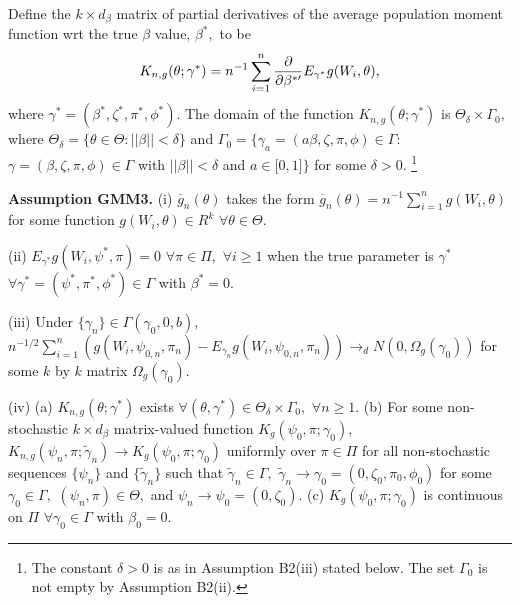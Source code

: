 \documentclass[12pt,thmsb,titlepage,final,oneside,letterpaper]{article}
\begin{document}
Define the $k\times d_{\beta }$ matrix of partial derivatives of the average
population moment function wrt the true $\beta $ value, $\beta ^{\ast },$ to
be%
\begin{equation}
K_{n,g}(\theta ;\gamma ^{\ast })=n^{-1}\sum_{i=1}^{n}\frac{\partial }{%
\partial \beta ^{\ast \prime }}E_{\gamma ^{\ast }}g(W_{i},\theta ),
\label{exp fn2}
\end{equation}%
where $\gamma ^{\ast }=(\beta ^{\ast },\zeta ^{\ast },\pi ^{\ast },\phi
^{\ast }).$ The domain of the function $K_{n,g}(\theta ;\gamma ^{\ast })$ is 
$\Theta _{\delta }\times \Gamma _{0},$ where $\Theta _{\delta }=\{\theta \in
\Theta :||\beta ||<\delta \}$ and $\Gamma _{0}=\{\gamma _{a}=(a\beta ,\zeta
,\pi ,\phi )\in \Gamma :$ $\gamma =(\beta ,\zeta ,\pi ,\phi )\in \Gamma $
with $||\beta ||<\delta $ and $a\in \lbrack 0,1]\}$ for some $\delta >0.$%
\footnote{%
The constant $\delta >0$ is as in Assumption B2(iii) stated below. The set $%
\Gamma _{0}$ is not empty by Assumption B2(ii).}\medskip

\noindent \textbf{Assumption GMM3.} (i) $\overline{g}_{n}\left( \theta
\right) $ takes the form $\overline{g}_{n}(\theta
)=n^{-1}\sum_{i=1}^{n}g(W_{i},\theta )$ for some function $g\left(
W_{i},\theta \right) \in R^{k}$ $\forall \theta \in \Theta .$

\noindent (ii) $E_{\gamma ^{\ast }}g(W_{i},\psi ^{\ast },\pi )=0$ $\forall
\pi \in \Pi ,$ $\forall i\geq 1$ when the true parameter is $\gamma ^{\ast }$
$\forall \gamma ^{\ast }=(\psi ^{\ast },\pi ^{\ast },\phi ^{\ast })\in
\Gamma $ with $\beta ^{\ast }=0.$

\noindent (iii) Under $\{\gamma _{n}\}\in \Gamma (\gamma _{0},0,b),$ $%
n^{-1/2}\sum_{i=1}^{n}(g(W_{i},\psi _{0,n},\pi _{n})-E_{\gamma
_{n}}g(W_{i},\psi _{0,n},\pi _{n}))\rightarrow _{d}N(0,\allowbreak \Omega
_{g}(\gamma _{0}))$ for some $k$ by $k$ matrix $\Omega _{g}(\gamma _{0}).$

\noindent (iv) (a) $K_{n,g}(\theta ;\gamma ^{\ast })$ exists $\forall
(\theta ,\gamma ^{\ast })\in \Theta _{\delta }\times \Gamma _{0},$ $\forall
n\geq 1.$ (b) For some non-stochastic $k\times d_{\beta }$ matrix-valued
function $K_{g}(\psi _{0},\pi ;\gamma _{0}),$ $K_{n,g}(\psi _{n},\pi ;%
\widetilde{\gamma }_{n})\rightarrow K_{g}(\psi _{0},\pi ;\gamma _{0})$
uniformly over $\pi \in \Pi $ for all non-stochastic sequences $\{\psi
_{n}\} $ and $\{\widetilde{\gamma }_{n}\}$ such that $\widetilde{\gamma }%
_{n}\in \Gamma ,$ $\widetilde{\gamma }_{n}\rightarrow \gamma _{0}=(0,\zeta
_{0},\pi _{0},\phi _{0})$ for some $\gamma _{0}\in \Gamma ,$ $(\psi _{n},\pi
)\in \Theta ,$ and $\psi _{n}\rightarrow \psi _{0}=(0,\zeta _{0}).$ (c) $%
K_{g}(\psi _{0},\pi ;\gamma _{0})$ is continuous on $\Pi $ $\forall \gamma
_{0}\in \Gamma $ with $\beta _{0}=0.$
\end{document}
